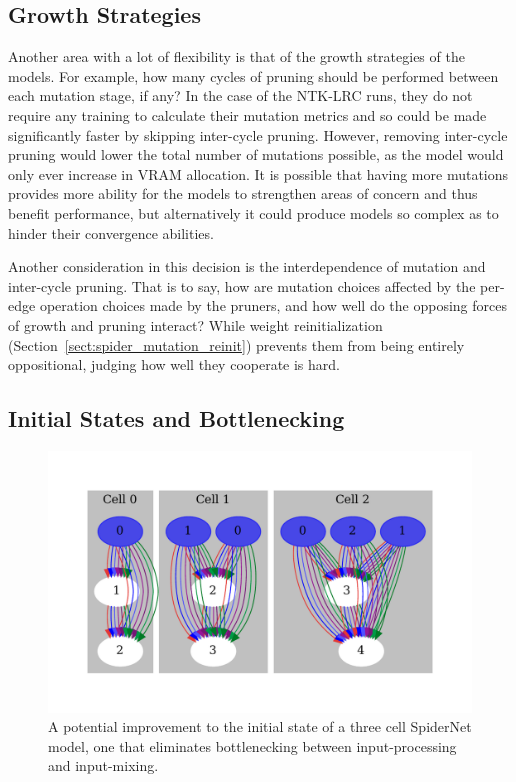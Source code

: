 \subsection{Growth Strategies}
Another area with a lot of flexibility is that of the growth strategies of the models. For example, how many
cycles of pruning should be performed between each mutation stage, if any? In the case of the NTK-LRC runs, they do not require
any training to calculate their mutation metrics and so could be made significantly faster by skipping inter-cycle pruning.
However, removing inter-cycle pruning would lower the total number of mutations possible, as the model
would only ever increase in VRAM allocation. It is possible that having more mutations provides more
ability for the models to strengthen areas of concern and thus benefit performance, but alternatively
it could produce models so complex as to hinder their convergence abilities.

Another consideration in this decision is the interdependence of mutation and inter-cycle pruning.
That is to say, how are mutation choices affected by the per-edge operation choices made by the pruners, and
how well do the opposing forces of growth and pruning interact? While weight
reinitialization (Section~\ref{sect:spider_mutation_reinit}) prevents them from being entirely oppositional, judging
how well they cooperate is hard.

\subsection{Initial States and Bottlenecking}
\begin{figure}[ht!]
    \centering
  \includegraphics[width=.85\textwidth, trim={0 1.5cm 0 1.5cm}, clip]{graphs/multi_input_initial_span}
    \caption[A potential improvement to the initial state of a three cell SpiderNet model]{A potential improvement
    to the initial state of a three cell SpiderNet model, one that eliminates bottlenecking
    between input-processing and input-mixing.}
    \label{fig:spider_multiin_initialization_span}
\end{figure}

